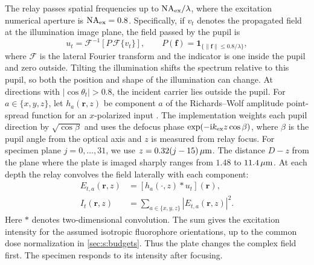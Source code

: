 The relay passes spatial frequencies up to $\mathrm{NA}_{\rm ex}/\lambda$, where the excitation numerical aperture is $\mathrm{NA}_{\rm ex}=0.8$. Specifically, if $v_t$ denotes the propagated field at the illumination image plane, the field passed by the pupil is
\begin{equation}
u_t=\mathcal F^{-1}\!\left[
P\,\mathcal F\{v_t\}\right],\qquad
P(\mathbf f)=\mathbf 1_{\{\|\mathbf f\|\leq0.8/\lambda\}},
\end{equation}
where $\mathcal F$ is the lateral Fourier transform and the indicator is one inside the pupil and zero outside. Tilting the illumination shifts the spectrum relative to this pupil, so both the position and shape of the illumination can change. At directions with $|\cos\theta_t|>0.8$, the incident carrier lies outside the pupil. For $a\in\{x,y,z\}$, let $h_a(\mathbf r,z)$ be component $a$ of the Richards--Wolf amplitude point-spread function for an $x$-polarized input \cite{richards1959,marian2007}. The implementation weights each pupil direction by $\sqrt{\cos\beta}$ and uses the defocus phase $\exp(-\mathrm i k_{\rm ex} z\cos\beta)$, where $\beta$ is the pupil angle from the optical axis and $z$ is measured from relay focus. For specimen plane $j=0,\dots,31$, we use $z=0.32(j-15)\,\mu\mathrm{m}$. The distance $D-z$ from the plane where the plate is imaged sharply ranges from $1.48$ to $11.4\,\mu\mathrm{m}$. At each depth the relay convolves the field laterally with each component:
\begin{equation}
\begin{aligned}
E_{t,a}(\mathbf r,z)&=[h_a(\cdot,z)*u_t](\mathbf r),\\
I_t(\mathbf r,z)&=\sum_{a\in\{x,y,z\}}|E_{t,a}(\mathbf r,z)|^2 .
\end{aligned}
\end{equation}
Here $*$ denotes two-dimensional convolution. The sum gives the excitation intensity for the assumed isotropic fluorophore orientations, up to the common dose normalization in \cref{sec:s:budgets}. Thus the plate changes the complex field first. The specimen responds to its intensity after focusing.

